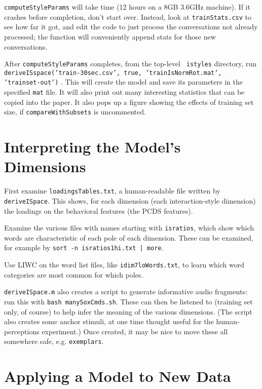 \documentclass[11pt]{article}
\begin{document}
{\tt computeStyleParams} will take time (12 hours on a 8GB 3.6GHz
machine).  If it crashes before completion, don't start over.
Instead, look at {\tt trainStats.csv} to see how far it got, and edit
the code to just process the conversations not already processed; the
function will conveniently append stats for those new conversations.

After {\tt computeStyleParams} completes, from the top-level {\tt
  istyles} directory, run {\tt deriveISspace('train-30sec.csv', true,
  'trainIsNormRot.mat', 'trainset-out')} .  This will create the model
and save its parameters in the specified {\tt mat} file. It will also
print out many interesting statistics that can be copied into the
paper.  It also pops up a figure showing the effects of training set
size, if {\tt compareWithSubsets} is uncommented.


\section{Interpreting the Model's Dimensions}

First examine {\tt loadingsTables.txt}, a human-readable file written
by {\tt deriveISpace}.  This shows, for each dimension (each
interaction-style dimension) the loadings on the behavioral features
(the PCDS features).

Examine the various files with names starting with {\tt isratios},
which show which words are characteristic of each pole of each
dimension.  These can be examined, for example by {\tt sort -n
  isratios1hi.txt | more}.  

Use LIWC on the word list files, like {\tt idim7loWords.txt}, to learn
which word categories are most common for which poles.

{\tt deriveISpace.m} also creates a script to generate informative
audio fragments: run this with {\tt bash manySoxCmds.sh}.  These can
then be listened to (training set only, of course) to help infer the
meaning of the various dimensions.  (The script also creates some
anchor stimuli, at one time thought useful for the human-perceptions
experiment.)  Once created, it may be nice to move these all
somewhere safe, e.g. {\tt exemplars}.



\section{Applying a Model to New Data}
\end{document}
